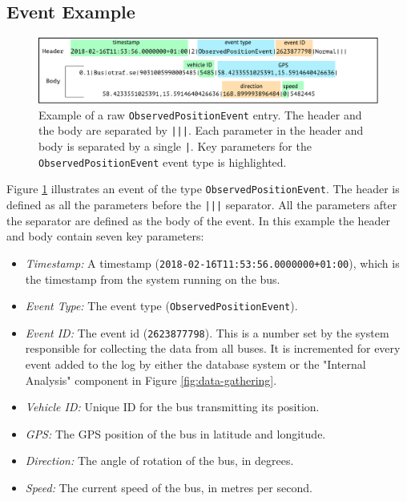 \subsection{Event Example}

\begin{figure}[ht!]
    \centering
    \includegraphics[width=\textwidth]{figures/data-example-1}
    \caption[Example of a raw \texttt{ObservedPositionEvent} entry]
    {\small Example of a raw \texttt{ObservedPositionEvent} entry.
    The header and the body are separated by \texttt{|||}.
    Each parameter in the header and body is separated by a single \texttt{|}.
    Key parameters for the \texttt{ObservedPositionEvent} event type is highlighted.}
    \label{fig:data-ex-1}
\end{figure}

Figure \ref{fig:data-ex-1} illustrates an event of the type \texttt{ObservedPositionEvent}.
The header is defined as all the parameters before the \texttt{|||} separator.
All the parameters after the separator are defined as the body of the event.
In this example the header and body contain seven key parameters: 
\begin{itemize}
    \item \textit{Timestamp:} A timestamp (\texttt{2018-02-16T11:53:56.0000000+01:00}), which is the timestamp from the system running on the bus.
    \item \textit{Event Type:} The event type (\texttt{ObservedPositionEvent}).
    \item \textit{Event ID:} The event id (\texttt{2623877798}). This is a number set by the system responsible for collecting the data from all buses.
    It is incremented for every event added to the log by either the database system or the "Internal Analysis" component in Figure \ref{fig:data-gathering}.
    \item \textit{Vehicle ID:} Unique ID for the bus transmitting its position.
    \item \textit{GPS:} The GPS position of the bus in latitude and longitude.
    \item \textit{Direction:} The angle of rotation of the bus, in degrees.
    \item \textit{Speed:} The current speed of the bus, in metres per second.
\end{itemize}


